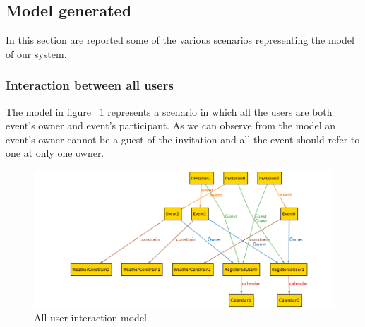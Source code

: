 \newpage
\subsection{Model generated}
In this section are reported some of the various scenarios representing the model of our system.
\subsubsection{Interaction between all users}
The model in figure ~\ref{fig:allint} represents a scenario in which all the users are both event's owner and event's participant. As we can observe from the model an  event's owner cannot be a guest of the invitation and all the event should refer to one at only one owner.
\begin{center}
 \begin{figure}[H]
    \includegraphics[width=1\textwidth,height=0.5\textwidth]{../Alloy/allInteration.png}
    \caption{All user interaction model}
     \label{fig:allint}
     \end{figure}
   \end{center} 
